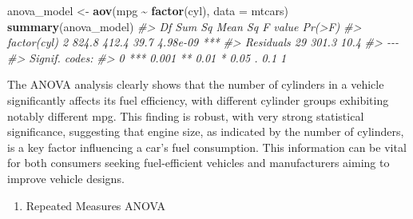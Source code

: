 \documentclass[
]{book}
\newenvironment{Shaded}{\begin{snugshade}}{\end{snugshade}}
\newcommand{\AttributeTok}[1]{\textcolor[rgb]{0.13,0.29,0.53}{#1}}
\newcommand{\CommentTok}[1]{\textcolor[rgb]{0.56,0.35,0.01}{\textit{#1}}}
\newcommand{\FunctionTok}[1]{\textcolor[rgb]{0.13,0.29,0.53}{\textbf{#1}}}
\newcommand{\NormalTok}[1]{#1}
\newcommand{\OtherTok}[1]{\textcolor[rgb]{0.56,0.35,0.01}{#1}}
\newcommand{\SpecialCharTok}[1]{\textcolor[rgb]{0.81,0.36,0.00}{\textbf{#1}}}
\providecommand{\tightlist}{%
  \setlength{\itemsep}{0pt}\setlength{\parskip}{0pt}}
\begin{document}
\begin{Shaded}
\begin{Highlighting}[]
\NormalTok{anova\_model }\OtherTok{\textless{}{-}} \FunctionTok{aov}\NormalTok{(mpg }\SpecialCharTok{\textasciitilde{}} \FunctionTok{factor}\NormalTok{(cyl), }\AttributeTok{data =}\NormalTok{ mtcars)}
\FunctionTok{summary}\NormalTok{(anova\_model)}
\CommentTok{\#\textgreater{}             Df Sum Sq Mean Sq F value   Pr(\textgreater{}F)    }
\CommentTok{\#\textgreater{} factor(cyl)  2  824.8   412.4    39.7 4.98e{-}09 ***}
\CommentTok{\#\textgreater{} Residuals   29  301.3    10.4                     }
\CommentTok{\#\textgreater{} {-}{-}{-}}
\CommentTok{\#\textgreater{} Signif. codes:  }
\CommentTok{\#\textgreater{} 0 \textquotesingle{}***\textquotesingle{} 0.001 \textquotesingle{}**\textquotesingle{} 0.01 \textquotesingle{}*\textquotesingle{} 0.05 \textquotesingle{}.\textquotesingle{} 0.1 \textquotesingle{} \textquotesingle{} 1}
\end{Highlighting}
\end{Shaded}

The ANOVA analysis clearly shows that the number of cylinders in a vehicle significantly affects its fuel efficiency, with different cylinder groups exhibiting notably different mpg. This finding is robust, with very strong statistical significance, suggesting that engine size, as indicated by the number of cylinders, is a key factor influencing a car's fuel consumption. This information can be vital for both consumers seeking fuel-efficient vehicles and manufacturers aiming to improve vehicle designs.

\begin{enumerate}
\def\labelenumi{\alph{enumi}.}
\setcounter{enumi}{4}
\tightlist
\item
  Repeated Measures ANOVA
\end{enumerate}
\end{document}
